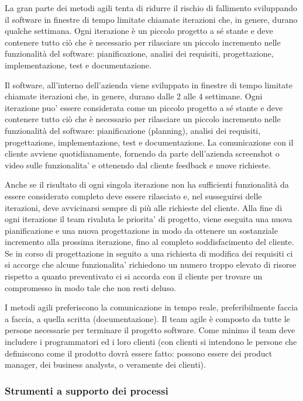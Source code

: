 La gran parte dei metodi agili tenta di ridurre il rischio di fallimento sviluppando il software in finestre di tempo limitate chiamate iterazioni che, in genere, durano qualche settimana. Ogni iterazione è un piccolo progetto a sé stante e deve contenere tutto ciò che è necessario per rilasciare un piccolo incremento nelle funzionalità del software: pianificazione, analisi dei requisiti, progettazione, implementazione, test e documentazione.

Il software, all'interno dell'azienda viene sviluppato in finestre di tempo limitate chiamate iterazioni che, in genere, durano dalle 2 alle 4 settimane. Ogni iterazione puo' essere considerata come un piccolo progetto a sé stante e deve contenere tutto ciò che è necessario per rilasciare un piccolo incremento nelle funzionalità del software: pianificazione (planning), analisi dei requisiti, progettazione, implementazione, test e documentazione. La comunicazione con il cliente avviene quotidianamente, fornendo da parte dell'azienda screenshot o video sulle funzionalita' e ottenendo dal cliente feedback e nuove richieste.

Anche se il risultato di ogni singola iterazione non ha sufficienti funzionalità da essere considerato completo deve essere rilasciato e, nel susseguirsi delle iterazioni, deve avvicinarsi sempre di più alle richieste del cliente. Alla fine di ogni iterazione il team rivaluta le priorita' di progetto, viene eseguita una nuova pianificazione e una nuova progettazione in modo da ottenere un sostanziale incremento alla prossima iterazione, fino al completo soddisfacimento del cliente. Se in corso di progettazione in seguito a una richiesta di modifica dei requisiti ci si accorge che alcune funzionalita' richiedono un numero troppo elevato di risorse rispetto a quanto preventivato ci si accorda con il cliente per trovare un compromesso in modo tale che non resti deluso.

I metodi agili preferiscono la comunicazione in tempo reale, preferibilmente faccia a faccia, a quella scritta (documentazione). Il team agile è composto da tutte le persone necessarie per terminare il progetto software. Come minimo il team deve includere i programmatori ed i loro clienti (con clienti si intendono le persone che definiscono come il prodotto dovrà essere fatto: possono essere dei product manager, dei business analysts, o veramente dei clienti).

\subsubsection{Strumenti a supporto dei processi}
